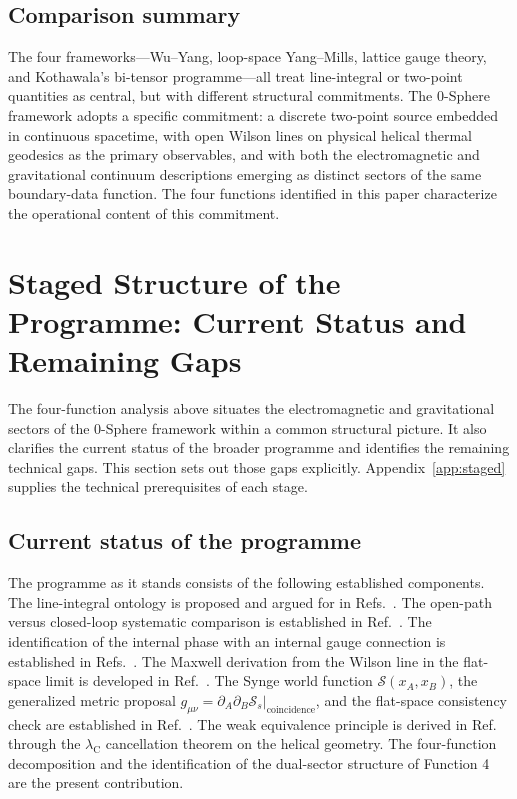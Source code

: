 \documentclass[%
 reprint, amsmath,amssymb, aps, prb, ]{revtex4-2}
\numberwithin{equation}{section}
\newcommand{\lambdaC}{\lambda_{\mathrm{C}}}
\begin{document}
\subsection{Comparison summary}

The four frameworks---Wu--Yang, loop-space Yang--Mills, lattice gauge theory, and Kothawala's bi-tensor programme---all treat line-integral or two-point quantities as central, but with different structural commitments. The 0-Sphere framework adopts a specific commitment: a discrete two-point source embedded in continuous spacetime, with open Wilson lines on physical helical thermal geodesics as the primary observables, and with both the electromagnetic and gravitational continuum descriptions emerging as distinct sectors of the same boundary-data function. The four functions identified in this paper characterize the operational content of this commitment.

\section{Staged Structure of the Programme: Current Status and Remaining Gaps}
\label{sec:metric_stage}

The four-function analysis above situates the electromagnetic and gravitational sectors of the 0-Sphere framework within a common structural picture. It also clarifies the current status of the broader programme and identifies the remaining technical gaps. This section sets out those gaps explicitly. Appendix~\ref{app:staged} supplies the technical prerequisites of each stage.

\subsection{Current status of the programme}

The programme as it stands consists of the following established components. The line-integral ontology is proposed and argued for in Refs.~\cite{hanamura29, hanamura31, hanamura40, hanamura41}. The open-path versus closed-loop systematic comparison is established in Ref.~\cite{hanamura43}. The identification of the internal phase with an internal gauge connection is established in Refs.~\cite{hanamura17, hanamura45}. The Maxwell derivation from the Wilson line in the flat-space limit is developed in Ref.~\cite{hanamura54}. The Synge world function $\mathcal{S}(x_A, x_B)$, the generalized metric proposal $g_{\mu\nu} = \partial_A\partial_B\mathcal{S}_s|_{\text{coincidence}}$, and the flat-space consistency check are established in Ref.~\cite{hanamura51}. The weak equivalence principle is derived in Ref.~\cite{hanamura52} through the $\lambdaC$ cancellation theorem on the helical geometry. The four-function decomposition and the identification of the dual-sector structure of Function 4 are the present contribution.
\end{document}
